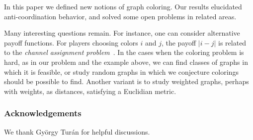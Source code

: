 \documentclass{llncs}
\begin{document}
In this paper we defined new notions of graph coloring.  Our results elucidated
anti-coordination behavior, and solved some open problems in related areas.

Many interesting questions remain.  For instance, one can consider alternative
payoff functions. For players choosing colors $i$ and $j$, the payoff $|i-j|$
is related to the \emph{channel assignment problem}~\cite{vandenHeuvel98}.  In
the cases when the coloring problem is hard, as in our problem and the example
above, we can find classes of graphs in which it is feasible, or study random
graphs in which we conjecture colorings should be possible to find.  Another
variant is to study weighted graphs, perhaps with weights, as distances,
satisfying a Euclidian metric.

\subsubsection*{Acknowledgements}
We thank Gy\"{o}rgy Tur\'{a}n for helpful discussions.



\end{document}

